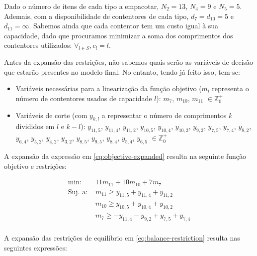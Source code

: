 \documentclass[12pt, a4paper, titlepage]{article}
\begin{document}
Dado o número de itens de cada tipo a empacotar, $N_2 = 13$, $N_4 = 9$ e $N_5 = 5$. Ademais, com a
disponibilidade de contentores de cada tipo, $d_7 = d_{10} = 5$ e $d_{11} = \infty$. Sabemos ainda
que cada contentor tem um custo igual à sua capacidade, dado que procuramos minimizar a soma dos
comprimentos dos contentores utilizados: $\forall_{l \in S}, c_l = l$.

Antes da expansão das restrições, não sabemos quais serão as variáveis de decisão que estarão
presentes no modelo final. No entanto, tendo já feito isso, tem-se:

\begin{itemize}
    \item Variáveis necessárias para a linearização da função objetivo ($m_l$ representa o número de
        contentores usados de capacidade $l$): $m_7$, $m_{10}$, $m_{11}$ $\in \mathbb{Z}^+_0$
    \item Variáveis de corte (com $y_{k, l}$ a representar o número de comprimentos $k$ divididos em
        $l$ e $k - l$): $y_{11, 5}$, $y_{11, 4}$, $y_{11, 2}$, $y_{10,5}$, $y_{10,4}$, $y_{10, 2}$,
        $y_{9, 2}$, $y_{7, 5}$, $y_{7, 4}$, $y_{8, 2}$, $y_{6, 4}$, $y_{5, 2}$, $y_{4, 2}$,
        $y_{3, 2}$, $y_{8, 5}$, $y_{9, 5}$, $y_{8, 4}$, $y_{5, 4}$, $y_{6, 5}$ $\in \mathbb{Z}^+_0$
\end{itemize}

A expansão da expressão em \eqref{eq:objective-expanded} resulta na seguinte função objetivo e
restrições:

\begin{equation}
    \begin{split}
        \text{min: }    & 11 m_{11} + 10 m_{10} + 7 m_7 \\
        \text{Suj. a: } & m_{11} \geq   y_{11, 5} + y_{11, 4} + y_{11, 2} \\
                        & m_{10} \geq   y_{10, 5} + y_{10, 4} + y_{10, 2} \\
                        & m_7    \geq - y_{11, 4} - y_{9, 2}  + y_{7, 5} + y_{7, 4} \\
    \end{split} \nonumber
\end{equation}

A expansão das restrições de equilíbrio em \eqref{eq:balance-restriction} resulta nas seguintes
expressões:
\end{document}
